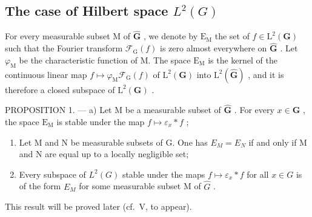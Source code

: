 \subsection{\texorpdfstring{The case of Hilbert space \(L^{2}(G)\)}{The case of Hilbert space L\^{}\{2\}(G)}}

For every measurable subset M of \(\widehat{\mathbf{G}}\) , we denote by \(\mathrm{E_M}\) the set of \(f \in \mathrm{L}^2(\mathbf{G})\) such that the Fourier transform \(\mathcal{F}_{\mathrm{G}}(f)\) is zero almost everywhere on \(\widehat{\mathbf{G}}\) . Let \(\varphi_{\mathrm{M}}\) be the characteristic function of M. The space \(\mathrm{E_M}\) is the kernel of the continuous linear map \(f \mapsto \varphi_{\mathrm{M}}\mathcal{F}_{\mathrm{G}}(f)\) of \(\mathrm{L}^2(\mathbf{G})\) into \(\mathrm{L}^2(\widehat{\mathbf{G}})\) , and it is therefore a closed subspace of \(\mathrm{L}^2(\mathbf{G})\) .

PROPOSITION 1. --- a) Let M be a measurable subset of \(\widehat{\mathbf{G}}\) . For every \(x \in \mathbf{G}\) , the space \(\mathrm{E}_{\mathrm{M}}\) is stable under the map \(f \mapsto \varepsilon_x * f\) ;

\begin{enumerate}
\def\labelenumi{\alph{enumi})}
\setcounter{enumi}{1}
\item
  Let M and N be measurable subsets of G. One has \(E_{M} = E_{N}\) if and only if M and N are equal up to a locally negligible set;
\item
  Every subspace of \(L^{2}(G)\) stable under the maps \(f \mapsto \varepsilon_{x} * f\) for all \(x \in G\) is of the form \(E_{M}\) for some measurable subset M of \(\widehat{G}\) .
\end{enumerate}

This result will be proved later (cf.~V, to appear).
\relax{}
